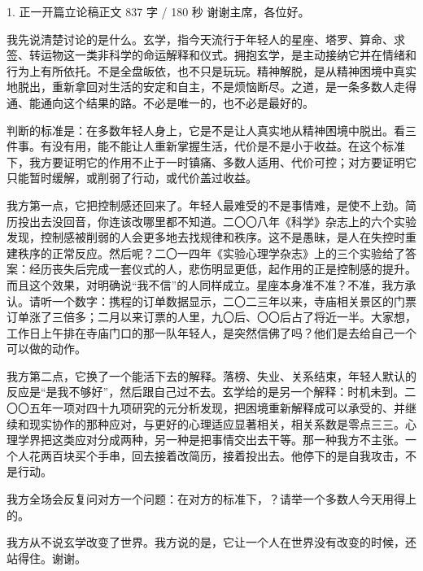 \documentclass[script,pro]{debate}
\begin{document}
\debatetitle
\begin{speech}{1. 正一开篇立论稿}{正文 837 字 / 180 秒}
谢谢主席，各位好。

我先说清楚讨论的是什么。玄学，指今天流行于年轻人的星座、塔罗、算命、求签、转运物这一类非科学的命运解释和仪式。拥抱玄学，是主动接纳它并在情绪和行为上有所依托。不是全盘皈依，也不只是玩玩。精神解脱，是从精神困境中真实地脱出，重新拿回对生活的安定和自主，不是烦恼断尽。之道，是一条多数人走得通、能通向这个结果的路。不必是唯一的，也不必是最好的。

判断的标准是：在多数年轻人身上，它是不是让人真实地从精神困境中脱出。看三件事。有没有用，能不能让人重新掌握生活，代价是不是小于收益。在这个标准下，我方要证明它的作用不止于一时镇痛、多数人适用、代价可控；对方要证明它只能暂时缓解，或削弱了行动，或代价盖过收益。

我方第一点，它把控制感还回来了。年轻人最难受的不是事情难，是使不上劲。简历投出去没回音，你连该改哪里都不知道。二〇〇八年《科学》杂志上的六个实验发现，控制感被削弱的人会更多地去找规律和秩序。这不是愚昧，是人在失控时重建秩序的正常反应。然后呢？二〇一四年《实验心理学杂志》上的三个实验给了答案：经历丧失后完成一套仪式的人，悲伤明显更低，起作用的正是控制感的提升。而且这个效果，对明确说“我不信”的人同样成立。星座本身准不准？不准，我方承认。请听一个数字：携程的订单数据显示，二〇二三年以来，寺庙相关景区的门票订单涨了三倍多；二月以来订票的人里，九〇后、〇〇后占了将近一半。大家想，工作日上午排在寺庙门口的那一队年轻人，是突然信佛了吗？他们是去给自己一个可以做的动作。

我方第二点，它换了一个能活下去的解释。落榜、失业、关系结束，年轻人默认的反应是“是我不够好”，然后跟自己过不去。玄学给的是另一个解释：时机未到。二〇〇五年一项对四十九项研究的元分析发现，把困境重新解释成可以承受的、并继续和现实协作的那种应对，与更好的心理适应显著相关，相关系数是零点三三。心理学界把这类应对分成两种，另一种是把事情交出去干等。那一种我方不主张。一个人花两百块买个手串，回去接着改简历，接着投出去。他停下的是自我攻击，不是行动。

我方全场会反复问对方一个问题：在对方的标准下，？请举一个多数人今天用得上的。

我方从不说玄学改变了世界。我方说的是，它让一个人在世界没有改变的时候，还站得住。谢谢。

\begin{contingency}
\end{contingency}
\end{speech}
\end{document}
